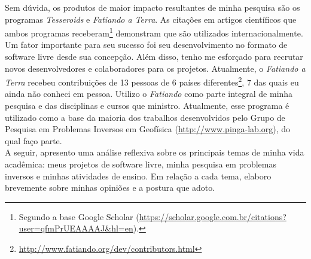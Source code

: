 Sem dúvida, os produtos de maior impacto resultantes de minha pesquisa são os
programas {\em Tesseroids} e {\em Fatiando a Terra}.
As citações em artigos científicos que ambos programas
receberam\footnote{Segundo a base Google Scholar
(\url{https://scholar.google.com.br/citations?user=qfmPrUEAAAAJ&hl=en}).}
demonstram que são utilizados internacionalmente.
Um fator importante para seu sucesso foi seu desenvolvimento no formato de
software livre desde sua concepção.
Além disso, tenho me esforçado para recrutar novos desenvolvedores e
colaboradores para os projetos.
Atualmente, o {\em Fatiando a Terra} recebeu contribuições de 13 pessoas de 6
países
diferentes\footnote{\url{http://www.fatiando.org/dev/contributors.html}},
7 das quais eu ainda não conheci em pessoa.
Utilizo o {\em Fatiando} como parte integral de minha pesquisa e das
disciplinas e cursos que ministro.
Atualmente, esse programa é utilizado como a base da maioria dos trabalhos
desenvolvidos pelo Grupo de Pesquisa em Problemas Inversos em Geofísica
(\url{http://www.pinga-lab.org}), do qual faço parte.
\\[0.5cm]

A seguir, apresento uma análise reflexiva sobre os principais temas de minha
vida acadêmica: meus projetos de software livre, minha pesquisa em problemas
inversos e minhas atividades de ensino.
Em relação a cada tema, elaboro brevemente sobre minhas opiniões e a postura
que adoto.
